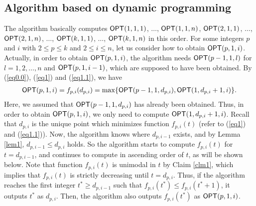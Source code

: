 \documentclass[a4paper]{llncs}
\begin{document}
\subsection{Algorithm based on dynamic programming}
\label{sec:mma}
The algorithm basically computes ${\sf OPT}(1, 1, 1)$, $\ldots$, ${\sf OPT}(1, 1, n)$, ${\sf OPT}(2, 1, 1)$, $\ldots$, ${\sf OPT}(2, 1, n)$, $\ldots$, ${\sf OPT}(k, 1, 1)$, $\ldots$, ${\sf OPT}(k, 1, n)$ in this order.
For some integers $p$ and $i$ with $2 \le p \le k$ and $2 \le i \le n$,
let us consider how to obtain ${\sf OPT}(p, 1, i)$.
Actually, in order to obtain ${\sf OPT}(p, 1, i)$, the algorithm needs ${\sf OPT}(p-1, 1, l)$ for $l = 1, 2, \ldots, n$ and ${\sf OPT}(p, 1, i-1)$, which are supposed to have been obtained.
By (\ref{eq0.0}), (\ref{eq1}) and (\ref{eq1.1}), we have
\begin{eqnarray}
{\sf OPT}(p, 1, i) = f_{p, i}(d_{p, i}) = \max \{ {\sf OPT}(p-1, 1, d_{p, i}), {\sf OPT}(1, d_{p, i}+1, i) \}. \label{eq8}
\end{eqnarray}
Here, we assumed that ${\sf OPT}(p-1, 1, d_{p, i})$ has already been obtained.
Thus, in order to obtain ${\sf OPT}(p, 1, i)$, we only need to compute ${\sf OPT}(1, d_{p, i} + 1, i)$.
Recall that $d_{p, i}$ is the unique point which minimizes function $f_{p, i}(t)$ (refer to (\ref{eq1}) and (\ref{eq1.1})).
Now, the algorithm knows where $d_{p, i-1}$ exists, and by Lemma \ref{lem1}, $d_{p, i-1} \le d_{p, i}$ holds.
So the algorithm starts to compute $f_{p, i}(t)$ for $t=d_{p, i-1}$,
and continues to compute in ascending order of $t$, as will be shown below.
Note that function $f_{p, i}(t)$ is unimodal in $t$ by Claim \ref{clm1}, 
which implies that $f_{p, i}(t)$ is strictly decreasing until $t=d_{p, i}$.
Thus, if the algorithm reaches the first integer $t^* \ge d_{p, i-1}$ such that $f_{p, i}(t^*) \le f_{p, i}(t^*+1)$,
it outputs $t^*$ as $d_{p, i}$.
Then, the algorithm also outputs $f_{p, i}(t^*)$ as ${\sf OPT}(p, 1, i)$.
\end{document}
